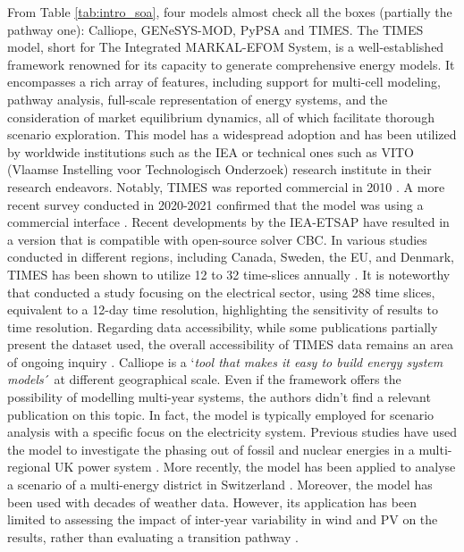 From Table \ref{tab:intro_soa}, four models almost check all the boxes (partially the pathway one): Calliope, GENeSYS-MOD, PyPSA and TIMES. 
The TIMES model, short for The Integrated MARKAL-EFOM System, is a well-established framework renowned for its capacity to generate comprehensive energy models. It encompasses a rich array of features, including support for multi-cell modeling, pathway analysis, full-scale representation of energy systems, and the consideration of market equilibrium dynamics, all of which facilitate thorough scenario exploration. This model has a widespread adoption and has been utilized by worldwide institutions such as the \gls{IEA} or technical ones such as VITO (Vlaamse Instelling voor Technologisch Onderzoek) research institute in their research endeavors. Notably, TIMES was reported commercial in 2010 \cite{Connolly2010}. A more recent survey conducted in 2020-2021 confirmed that the model was using a commercial interface \cite{chang2021trends}. Recent developments by the IEA-ETSAP have resulted in a version that is compatible with open-source solver CBC. In various studies conducted in different regions, including Canada, Sweden, the EU, and Denmark, TIMES has been shown to utilize 12 to 32 time-slices annually \cite{prina2020classification}. It is noteworthy that \citet{haydt2011relevance} conducted a study focusing on the electrical sector, using 288 time slices, equivalent to a 12-day time resolution, highlighting the sensitivity of results to time resolution. Regarding data accessibility, while some publications partially present the dataset used, the overall accessibility of TIMES data remains an area of ongoing inquiry \cite{openmod_times_description}. 
 Calliope is a `\emph{tool that makes it easy to build energy system models}´ at different geographical scale. Even if the framework offers the possibility of modelling multi-year systems, the authors didn't find a relevant publication on this topic. In fact, the model is typically employed for scenario analysis with a specific focus on the electricity system. Previous studies have used the model to investigate the phasing out of fossil and nuclear energies in a multi-regional UK power system \cite{pfenninger2015renewables}. More recently, the model has been applied to analyse a scenario of a multi-energy district in Switzerland \cite{pickering2021quantifying}. Moreover, the model has been used with decades of weather data. However, its application has been limited to assessing the impact of inter-year variability in wind and PV on the results, rather than evaluating a transition pathway \cite{pfenninger2017dealing}. 
